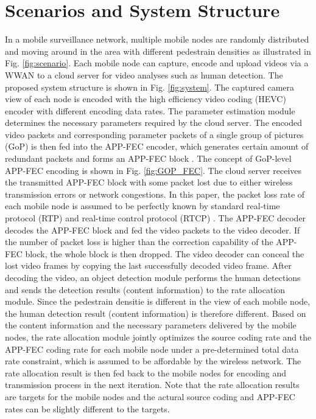 \documentclass[journal]{IEEEtran}
\begin{document}
\section{Scenarios and System Structure}
In a mobile surveillance network, multiple mobile nodes are randomly distributed and moving around in the area with different pedestrain densities as illustrated in Fig. \ref{fig:scenario}. Each mobile node can capture, encode and upload videos via a WWAN to a cloud server for video analyses such as human detection. The proposed system structure is shown in Fig. \ref{fig:system}. The captured camera view of each node is encoded with the high efficiency video coding (HEVC) \cite{SOHW12} encoder with different encoding data rates. The parameter estimation module determines the necessary parameters required by the cloud server. The encoded video packets and corresponding parameter packets of a single group of pictures (GoP) is then fed into the APP-FEC encoder, which generates certain amount of redundant packets and forms an APP-FEC block \cite{WSHZ13,BaTO08}. The concept of GoP-level APP-FEC encoding is shown in Fig. \ref{fig:GOP_FEC}. The cloud server receives the transmitted APP-FEC block with some packet lost due to either wireless transmission errors or network congestions. In this paper, the packet loss rate of each mobile node is assumed to be perfectly known by standard real-time protocol (RTP) and real-time control protocol (RTCP) \cite{Perk03,CHWY15}. The APP-FEC decoder decodes the APP-FEC block and fed the video packets to the video decoder. If the number of packet loss is higher than the correction capability of the APP-FEC block, the whole block is then dropped. The video decoder can conceal the lost video frames by copying the last successfully decoded video frame. After decoding the video, an object detection module performs the human detections and sends the detection results (content information) to the rate allocation module. Since the pedestrain densitie is different in the view of each mobile node, the human detection result (content information) is therefore different. Based on the content information and the necessary parameters delivered by the mobile nodes, the rate allocation module jointly optimizes the source coding rate and the APP-FEC coding rate for each mobile node under a pre-determined total data rate constraint, which is assumed to be affordable by the wireless network. The rate allocation result is then fed back to the mobile nodes for encoding and transmission process in the next iteration. Note that the rate allocation results are targets for the mobile nodes and the actural source coding and APP-FEC rates can be slightly different to the targets.
\end{document}
